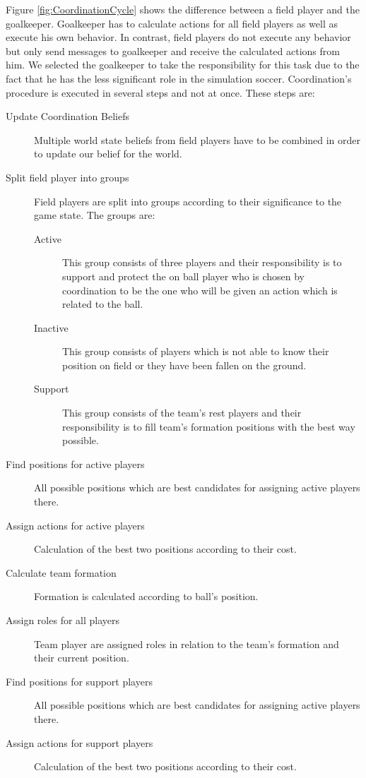 Figure \ref{fig:CoordinationCycle} shows the difference between a field player and the goalkeeper. Goalkeeper has to calculate actions for all field players as well as execute his own behavior. In contrast, field players do not execute any behavior but only send messages to goalkeeper and receive the calculated actions from him. We selected the goalkeeper to take the responsibility for this task due to the fact that he has the less significant role in the simulation soccer. Coordination's procedure is executed in several steps and not at once. These steps are:
\begin{description}
\item[Update Coordination Beliefs] Multiple world state beliefs from field players have to be combined in order to update our belief for the world.
\item[Split field player into groups] Field players are split into groups according to their significance to the game state. The groups are:
\begin{description}
\item[Active] This group consists of three players and their responsibility is to support and protect the on ball player who is chosen by coordination to be the one who will be given an action which is related to the ball.
\item[Inactive] This group consists of players which is not able to know their position on field or they have been fallen on the ground.
\item[Support] This group consists of the team's rest players and their responsibility is to fill team's formation positions with the best way possible.
\end{description}
\item[Find positions for active players] All possible positions which are best candidates for assigning active players there.
\item[Assign actions for active players] Calculation of the best two positions according to their cost.
\item[Calculate team formation] Formation is calculated according to ball's position.
\item[Assign roles for all players] Team player are assigned roles in relation to the team's formation and their current position.
\item[Find positions for support players] All possible positions which are best candidates for assigning active players there.
\item[Assign actions for support players] Calculation of the best two positions according to their cost.
\end{description}
